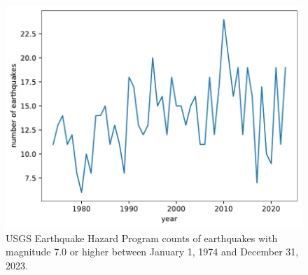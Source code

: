 \begin{figure}[H]
    \centering
    \includegraphics[width=0.5\linewidth]{data/05_reporting/problem_set_3/quake_counts.pdf}
    \caption{USGS Earthquake Hazard Program counts of earthquakes with magnitude 7.0 or higher between January 1, 1974 and December 31, 2023.}
    \label{fig:quake-counts}
\end{figure}